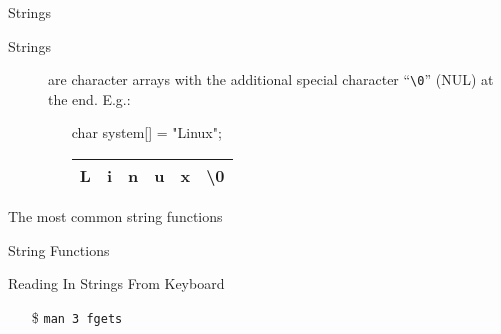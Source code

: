 \begin{frame}[fragile=singleslide]{Strings}
  \begin{description}
  \item[Strings] are \alert{character arrays} with the additional special character ``\verb|\0|''
    (NUL) at the end. E.g.:\ttfamily
    \begin{itemize}
    \item[] char system[] = "Linux";
    \item[] \begin{tabular}{*{6}{|c}|} \hline
              L&i&n&u&x&\textbackslash0\\\hline
            \end{tabular}
          \end{itemize}
  \end{description}
  \begin{iblock}{The most common string functions}
    \begin{center}
    \end{center}
  \end{iblock}
\end{frame}

\begin{frame}{String Functions}
  \begin{iblock}{}
  \end{iblock}
\end{frame}

\begin{frame}{Reading In Strings From Keyboard}
  \begin{iblock}{}
  \end{iblock}
  \begin{itemize}
  \item[\$] \texttt{man 3 fgets}
  \end{itemize}
\end{frame}

\begin{frame}
  \begin{iblock}{}
    \begin{center}
    \end{center}
  \end{iblock}
\end{frame}

